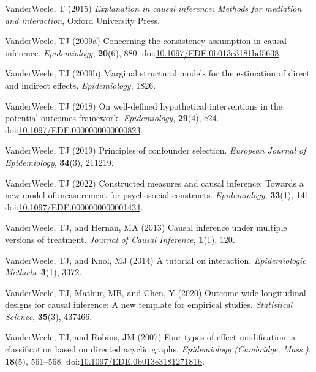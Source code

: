 \documentclass[
  singlecolumn,
  9pt]{article}
\begin{document}
\begin{CSLReferences}
VanderWeele, T (2015) \emph{Explanation in causal inference: Methods for
mediation and interaction}, Oxford University Press.

VanderWeele, TJ (2009a) Concerning the consistency assumption in causal
inference. \emph{Epidemiology}, \textbf{20}(6), 880.
doi:\href{https://doi.org/10.1097/EDE.0b013e3181bd5638}{10.1097/EDE.0b013e3181bd5638}.

VanderWeele, TJ (2009b) Marginal structural models for the estimation of
direct and indirect effects. \emph{Epidemiology}, 1826.

VanderWeele, TJ (2018) On well-defined hypothetical interventions in the
potential outcomes framework. \emph{Epidemiology}, \textbf{29}(4), e24.
doi:\href{https://doi.org/10.1097/EDE.0000000000000823}{10.1097/EDE.0000000000000823}.

VanderWeele, TJ (2019) Principles of confounder selection.
\emph{European Journal of Epidemiology}, \textbf{34}(3), 211219.

VanderWeele, TJ (2022) Constructed measures and causal inference:
Towards a new model of measurement for psychosocial constructs.
\emph{Epidemiology}, \textbf{33}(1), 141.
doi:\href{https://doi.org/10.1097/EDE.0000000000001434}{10.1097/EDE.0000000000001434}.

VanderWeele, TJ, and Hernan, MA (2013) Causal inference under multiple
versions of treatment. \emph{Journal of Causal Inference},
\textbf{1}(1), 120.

VanderWeele, TJ, and Knol, MJ (2014) A tutorial on interaction.
\emph{Epidemiologic Methods}, \textbf{3}(1), 3372.

VanderWeele, TJ, Mathur, MB, and Chen, Y (2020) Outcome-wide
longitudinal designs for causal inference: A new template for empirical
studies. \emph{Statistical Science}, \textbf{35}(3), 437466.

VanderWeele, TJ, and Robins, JM (2007) Four types of effect
modification: a classification based on directed acyclic graphs.
\emph{Epidemiology (Cambridge, Mass.)}, \textbf{18}(5), 561--568.
doi:\href{https://doi.org/10.1097/EDE.0b013e318127181b}{10.1097/EDE.0b013e318127181b}.


\end{CSLReferences}
\end{document}
